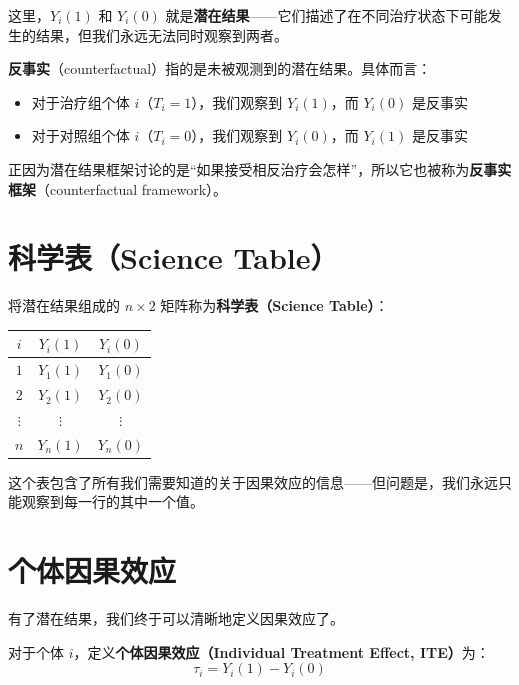 这里，$Y_i(1)$ 和 $Y_i(0)$ 就是\textbf{潜在结果}——它们描述了在不同治疗状态下可能发生的结果，但我们永远无法同时观察到两者。

\begin{Remark}[注 2.1 — 什么是反事实]
\textbf{反事实}（counterfactual）指的是未被观测到的潜在结果。具体而言：
\begin{itemize}
  \item 对于治疗组个体 $i$（$T_i=1$），我们观察到 $Y_i(1)$，而 $Y_i(0)$ 是反事实
  \item 对于对照组个体 $i$（$T_i=0$），我们观察到 $Y_i(0)$，而 $Y_i(1)$ 是反事实
\end{itemize}
正因为潜在结果框架讨论的是``如果接受相反治疗会怎样''，所以它也被称为\textbf{反事实框架}（counterfactual framework）。
\end{Remark}


\section{科学表（Science Table）}

\cite{rubin2005} 将潜在结果组成的 $n \times 2$ 矩阵称为\textbf{科学表（Science Table）}：

\begin{center}
\begin{tabular}{ccc}
\hline
$i$ & $Y_i(1)$ & $Y_i(0)$ \\
\hline
$1$ & $Y_1(1)$ & $Y_1(0)$ \\
$2$ & $Y_2(1)$ & $Y_2(0)$ \\
$\vdots$ & $\vdots$ & $\vdots$ \\
$n$ & $Y_n(1)$ & $Y_n(0)$ \\
\hline
\end{tabular}
\end{center}

这个表包含了所有我们需要知道的关于因果效应的信息——但问题是，我们永远只能观察到每一行的其中一个值。

\section{个体因果效应}

有了潜在结果，我们终于可以清晰地定义因果效应了。

对于个体 $i$，定义\textbf{个体因果效应（Individual Treatment Effect, ITE）}为：
\[
\tau_i = Y_i(1) - Y_i(0)
\]

